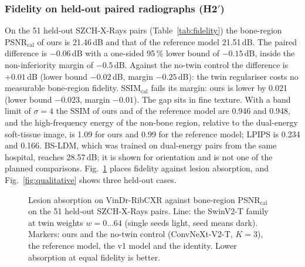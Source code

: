 \subsubsection{Fidelity on held-out paired radiographs (H2$'$)}
On the 51 held-out SZCH-X-Rays pairs (Table~\ref{tab:fidelity}) the bone-region PSNR$_{\mathrm{cal}}$ of ours is 21.46\,dB and that of the
reference model 21.51\,dB. The paired difference is $-0.06$\,dB with a one-sided 95\,\% lower bound of $-0.15$\,dB, inside the
non-inferiority margin of $-0.5$\,dB. Against the no-twin control the difference is $+0.01$\,dB (lower bound $-0.02$\,dB, margin
$-0.25$\,dB): the twin regulariser costs no measurable bone-region fidelity. SSIM$_{\mathrm{cal}}$ fails its margin: ours is lower by 0.021
(lower bound $-0.023$, margin $-0.01$). The gap sits in fine texture. With a band limit of $\sigma=4$ the SSIM of ours and of the reference
model are 0.946 and 0.948, and the high-frequency energy of the non-bone region, relative to the dual-energy soft-tissue image, is 1.09 for
ours and 0.99 for the reference model; LPIPS is 0.234 and 0.166. BS-LDM, which was trained on dual-energy pairs from the same hospital,
reaches 28.57\,dB; it is shown for orientation and is not one of the planned comparisons. Fig.~\ref{fig:pareto} places fidelity against
lesion absorption, and Fig.~\ref{fig:qualitative} shows three held-out cases.

\begin{table}[!t]
\centering
\caption{Held-out SZCH-X-Rays pairs (51): calibrated fidelity of ours and the comparators (top; HF ratio: high-frequency energy of the
non-bone region relative to the dual-energy soft-tissue image, 1 = equal) and the H2$'$ non-inferiority tests (bottom; paired differences,
image bootstrap, one-sided 95\,\% lower bound). Every method and seed, raw and calibrated, is in Supplementary Table~S1.}
\label{tab:fidelity}
\end{table}

\begin{figure}[!t]
\centering
{}
\caption{Lesion absorption on VinDr-RibCXR against bone-region PSNR$_{\mathrm{cal}}$ on the 51 held-out SZCH-X-Rays pairs. Line: the
SwinV2-T family at twin weights $w=0\ldots64$ (single seeds light, seed means dark). Markers: ours and the no-twin control
(ConvNeXt-V2-T, $K=3$), the reference model, the v1 model and the identity. Lower absorption at equal fidelity is better.}
\label{fig:pareto}
\end{figure}

